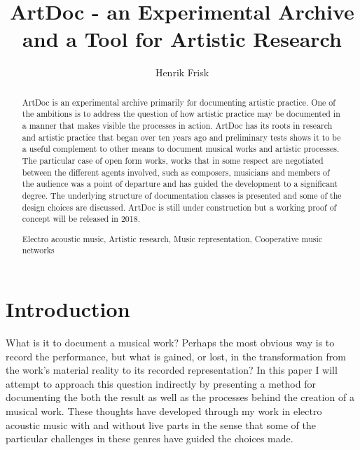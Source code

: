 \documentclass[,a4paper]{llncs}
\newcommand{\keywords}[1]{\par\addvspace\baselineskip
\noindent\keywordname\enspace\ignorespaces#1}
\begin{document}
\mainmatter  %

\title{ArtDoc - an Experimental Archive and a Tool for Artistic Research}

\author{Henrik Frisk}


\maketitle

\begin{abstract}
  ArtDoc is an experimental archive primarily for documenting artistic practice. One of the ambitions is to address the question of how artistic practice may be documented in a manner that makes visible the processes in action. ArtDoc has its roots in research and artistic practice that began over ten years ago and preliminary tests shows it to be a useful complement to other means to document musical works and artistic processes. The particular case of open form works, works that in some respect are negotiated between the different agents involved, such as composers, musicians and members of the audience was a point of departure and has guided the development to a significant degree. The underlying structure of documentation classes is presented and some of the design choices are discussed. ArtDoc is still under construction but a working proof of concept will be released in 2018.
  
\keywords{Electro acoustic music, Artistic research, Music representation, Cooperative music networks}
\end{abstract}

\section{Introduction}
What is it to document a musical work? Perhaps the most obvious way is to record the performance, but what is gained, or lost, in the transformation from the work's material reality to its recorded representation? In this paper I will attempt to approach this question indirectly by presenting a method for documenting the both the result as well as the processes behind the creation of a musical work. These thoughts have developed through my work in electro acoustic music with and without live parts in the sense that some of the particular challenges in these genres have guided the choices made.
\end{document}
